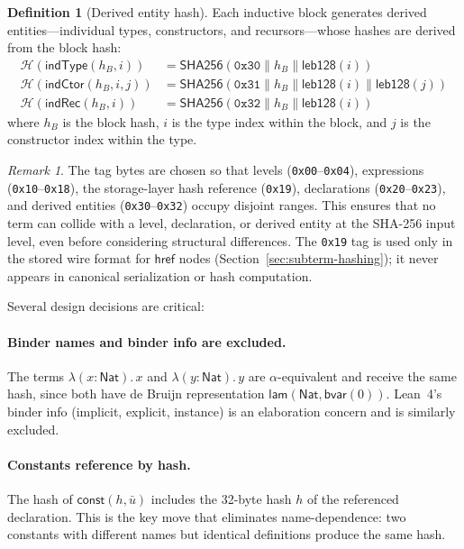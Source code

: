 \documentclass[11pt]{article}
\theoremstyle{definition}
\newtheorem{definition}{Definition}[section]
\theoremstyle{plain}
\theoremstyle{remark}
\newtheorem{remark}{Remark}[section]
\newcommand{\hash}{\mathcal{H}}
\newcommand{\SHA}{\textsf{SHA256}}
\newcommand{\Nat}{\textsf{Nat}}
\newcommand{\bvar}{\textsf{bvar}}
\newcommand{\const}{\textsf{const}}
\newcommand{\lam}{\textsf{lam}}
\newcommand{\concat}{\mathbin{\|}}
\newcommand{\hrefE}{\textsf{href}}
\begin{document}
\begin{definition}[Derived entity hash]
\label{def:hash-derived}
Each inductive block generates derived entities---individual types, constructors, and recursors---whose
hashes are derived from the block hash:
\begin{align*}
  \hash(\textsf{indType}(h_B, i)) &= \SHA(\mathtt{0x30} \concat h_B \concat \textsf{leb128}(i)) \\
  \hash(\textsf{indCtor}(h_B, i, j)) &= \SHA(\mathtt{0x31} \concat h_B \concat \textsf{leb128}(i) \concat \textsf{leb128}(j)) \\
  \hash(\textsf{indRec}(h_B, i)) &= \SHA(\mathtt{0x32} \concat h_B \concat \textsf{leb128}(i))
\end{align*}
where $h_B$ is the block hash, $i$ is the type index within the block, and $j$ is the constructor index within the type.
\end{definition}

\begin{remark}
The tag bytes are chosen so that levels (\texttt{0x00}--\texttt{0x04}),
expressions (\texttt{0x10}--\texttt{0x18}), the storage-layer hash reference (\texttt{0x19}),
declarations (\texttt{0x20}--\texttt{0x23}),
and derived entities (\texttt{0x30}--\texttt{0x32})
occupy disjoint ranges.
This ensures that no term can collide with a level, declaration, or derived entity at the SHA-256 input level,
even before considering structural differences.
The \texttt{0x19} tag is used only in the stored wire format for $\hrefE$ nodes
(Section~\ref{sec:subterm-hashing}); it never appears in canonical serialization or hash computation.
\end{remark}

Several design decisions are critical:

\paragraph{Binder names and binder info are excluded.}
The terms $\lambda(x{:}\Nat).\,x$ and $\lambda(y{:}\Nat).\,y$ are $\alpha$-equivalent
and receive the same hash, since both have de Bruijn representation
$\lam(\Nat, \bvar(0))$.
Lean~4's binder info (implicit, explicit, instance) is an elaboration concern
and is similarly excluded.

\paragraph{Constants reference by hash.}
The hash of $\const(h, \bar{u})$ includes the 32-byte hash $h$ of the referenced declaration.
This is the key move that eliminates name-dependence: two constants with different names but
identical definitions produce the same hash.
\end{document}
